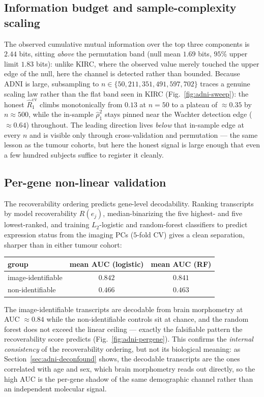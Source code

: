 \documentclass{article}
\begin{document}
\subsection{Information budget and sample-complexity scaling}
\label{sec:adni-sweep}
The observed cumulative mutual information over the top three components is
$2.44$ bits, sitting \emph{above} the permutation band (null mean $1.69$ bits,
$95\%$ upper limit $1.83$ bits): unlike KIRC, where the observed value merely
touched the upper edge of the null, here the channel is detected rather than
bounded. Because ADNI is large, subsampling to
$n \in \{50, 211, 351, 491, 597, 702\}$ traces a genuine scaling law rather than
the flat band seen in KIRC (Fig.~\ref{fig:adni-sweep}): the honest $\hat
R_1^{\mathrm{cv}}$ climbs monotonically from $0.13$ at $n=50$ to a plateau of
$\approx 0.35$ by $n \approx 500$, while the in-sample $\hat\rho_1^2$ stays
pinned near the Wachter detection edge ($\approx 0.64$) throughout. The leading
direction lives \emph{below} that in-sample edge at every $n$ and is visible
only through cross-validation and permutation --- the same lesson as the tumour
cohorts, but here the honest signal is large enough that even a few hundred
subjects suffice to register it cleanly.

\subsection{Per-gene non-linear validation}
\label{sec:adni-pergene}
The recoverability ordering predicts gene-level decodability. Ranking
transcripts by model recoverability $R(e_j)$, median-binarizing the five
highest- and five lowest-ranked, and training $L_2$-logistic and random-forest
classifiers to predict expression status from the imaging PCs ($5$-fold CV)
gives a clean separation, sharper than in either tumour cohort:
\begin{center}
\begin{tabular}{lcc}
\toprule
group               & mean AUC (logistic) & mean AUC (RF) \\
\midrule
image-identifiable  & $0.842$ & $0.841$ \\
non-identifiable    & $0.466$ & $0.463$ \\
\bottomrule
\end{tabular}
\end{center}
The image-identifiable transcripts are decodable from brain morphometry at
AUC $\approx 0.84$ while the non-identifiable controls sit at chance, and the
random forest does not exceed the linear ceiling --- exactly the falsifiable
pattern the recoverability score predicts (Fig.~\ref{fig:adni-pergene}). This
confirms the \emph{internal consistency} of the recoverability ordering, but
not its biological meaning: as Section~\ref{sec:adni-deconfound} shows, the
decodable transcripts are the ones correlated with age and sex, which brain
morphometry reads out directly, so the high AUC is the per-gene shadow of the
same demographic channel rather than an independent molecular signal.
\end{document}
